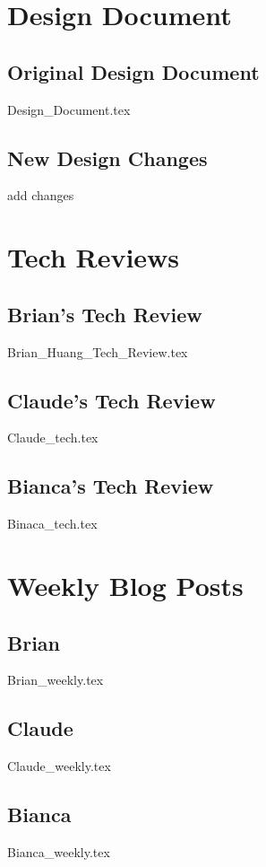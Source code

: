\documentclass[onecolumn, draftclsnofoot,10pt, compsoc]{IEEEtran}
\begin{document}
	\section{Design Document}
	\subsection{Original Design Document}
	{Design_Document.tex}
	\subsection{New Design Changes}
	add changes	
	
	\section{Tech Reviews}
	\subsection{Brian's Tech Review}
	{Brian_Huang_Tech_Review.tex}
	\subsection{Claude's Tech Review}
	{Claude_tech.tex}
	\subsection{Bianca's Tech Review}
	{Binaca_tech.tex}
	
	\section{Weekly Blog Posts}
	
	\subsection{Brian}
	{Brian_weekly.tex}
	
	\subsection{Claude}
	{Claude_weekly.tex}
	
	\subsection{Bianca}
	{Bianca_weekly.tex}
	
\end{document}
